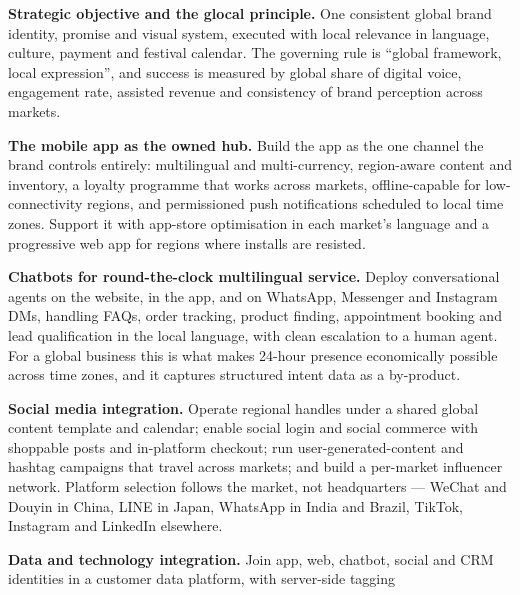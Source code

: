 \begin{qlist}
\begin{apts}
\item \textbf{Strategic objective and the glocal principle.} One consistent
      global brand identity, promise and visual system, executed with local
      relevance in language, culture, payment and festival calendar. The
      governing rule is ``global framework, local expression'', and success is
      measured by global share of digital voice, engagement rate, assisted
      revenue and consistency of brand perception across markets.
\item \textbf{The mobile app as the owned hub.} Build the app as the one
      channel the brand controls entirely: multilingual and multi-currency,
      region-aware content and inventory, a loyalty programme that works across
      markets, offline-capable for low-connectivity regions, and permissioned
      push notifications scheduled to local time zones. Support it with
      app-store optimisation in each market's language and a progressive web
      app for regions where installs are resisted.
\item \textbf{Chatbots for round-the-clock multilingual service.} Deploy
      conversational agents on the website, in the app, and on WhatsApp,
      Messenger and Instagram DMs, handling FAQs, order tracking, product
      finding, appointment booking and lead qualification in the local
      language, with clean escalation to a human agent. For a global business
      this is what makes 24-hour presence economically possible across time
      zones, and it captures structured intent data as a by-product.
\item \textbf{Social media integration.} Operate regional handles under a
      shared global content template and calendar; enable social login and
      social commerce with shoppable posts and in-platform checkout; run
      user-generated-content and hashtag campaigns that travel across markets;
      and build a per-market influencer network. Platform selection follows the
      market, not headquarters --- WeChat and Douyin in China, LINE in Japan,
      WhatsApp in India and Brazil, TikTok, Instagram and LinkedIn elsewhere.
\item \textbf{Data and technology integration.} Join app, web, chatbot, social
      and CRM identities in a customer data platform, with server-side tagging

\end{apts}
\end{qlist}
